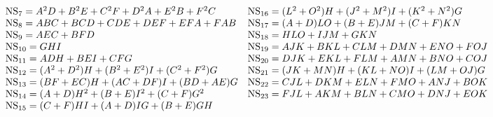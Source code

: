 \begin{equation*}
  \begin{array}{ll}
{\rm NS}_7 = A^2D+B^2E+C^2F+D^2A+E^2B+F^2C & {\rm NS}_{16} = (L^2+O^2)H +(J^2+M^2)I +(K^2+N^2)G \\
{\rm NS}_8 = ABC+ BCD +CDE +DEF +EFA+FAB  & {\rm NS}_{17} = (A+D)LO + (B+E)JM+(C+F)KN\\
{\rm NS}_9 = AEC +BFD & {\rm NS}_{18} = HLO + IJM+ GKN  \\
{\rm NS}_{10} = GHI & {\rm NS}_{19} = AJK+BKL+CLM+DMN+ENO+FOJ \\
{\rm NS}_{11} = ADH+BEI+CFG & {\rm NS}_{20} = DJK+EKL+FLM+AMN+BNO+COJ \\
{\rm NS}_{12} = (A^2+D^2)H +(B^2+E^2)I +(C^2+F^2)G & {\rm NS}_{21} = (JK+MN)H+(KL+NO)I+(LM+OJ)G \\
{\rm NS}_{13} = (BF+EC)H+(AC+DF)I +(BD+AE)G & {\rm NS}_{22} = CJL+DKM+ELN+FMO+ANJ+BOK \\
{\rm NS}_{14} = (A+D)H^2 +(B+E)I^2+(C+F)G^2 & {\rm NS}_{23} = FJL+AKM+BLN+CMO+DNJ+EOK  \\
{\rm NS}_{15} = (C+F)HI+(A+D)IG+(B+E)GH & \\
  \end{array}
\end{equation*}

